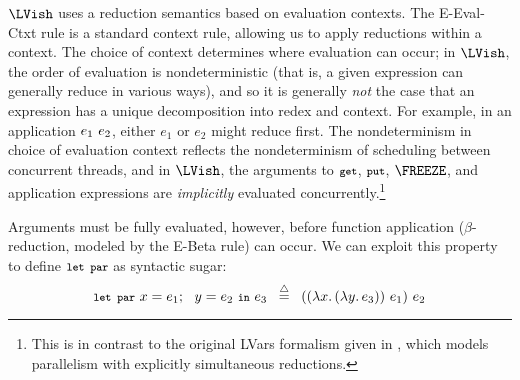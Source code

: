 $\LVish$ uses a reduction semantics based on evaluation
contexts. %
The {\sc E-Eval-Ctxt} rule is a standard context rule, allowing us to apply
reductions within a context.  The choice of context determines where evaluation
can occur; in $\LVish$, the order of evaluation is nondeterministic (that is, a
given expression can generally reduce in various ways), and so it is generally
\emph{not} the case that an expression has a unique decomposition into redex and
context.  For example, in an application $e_1~e_2$, either $e_1$ or $e_2$
might reduce first.  The nondeterminism in choice of evaluation context reflects
the nondeterminism of scheduling between concurrent threads, and in $\LVish$,
the arguments to $\mbox{\footnotesize \texttt{get}}$, $\mbox{\footnotesize \texttt{put}}$, $\FREEZE$, and application expressions are
\emph{implicitly} evaluated concurrently.\footnote{This is in contrast to
  the original LVars formalism given in \cite{LVars-paper},
  which models parallelism with explicitly simultaneous
  reductions.}

Arguments must be fully evaluated, however, before function application
($\beta$-reduction, modeled by the {\sc E-Beta} rule) can occur.  We can exploit
this property to define $\mbox{\footnotesize \texttt{\mbox{\footnotesize \texttt{let}}~\mbox{\footnotesize \texttt{par}}}}$ as syntactic sugar:
\[
\mbox{\footnotesize \texttt{\mbox{\footnotesize \texttt{let}}~\mbox{\footnotesize \texttt{par}}}} ~x = e_1;~~y = e_2~\mbox{\footnotesize \texttt{in}}~e_3 \;\;\stackrel{\triangle}{=}\;\;
((\lambda x.\,(\lambda y.\,e_3))~e_1)~e_2
\]

